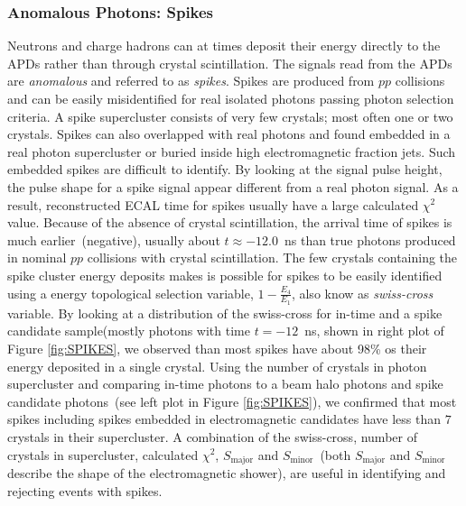 \subsubsection{Anomalous Photons: Spikes}
Neutrons and charge hadrons can at times deposit their energy directly to the APDs rather than through crystal scintillation. The signals read from the APDs are \textit{anomalous}  and referred to as \textit{spikes}. Spikes are produced from $pp$ collisions and can be easily misidentified for real isolated photons passing photon selection criteria. A spike supercluster consists of very few crystals; most often one or two crystals. Spikes can also overlapped with real photons and found embedded in a real photon supercluster or buried inside high electromagnetic fraction jets. Such embedded spikes are difficult to identify. By looking at the signal pulse height, the pulse shape for a spike signal appear different from a real photon signal. As a result, reconstructed ECAL time for spikes usually have a large calculated $\chi^{2}$ value.
\newline
Because of the absence of crystal scintillation, the arrival time of spikes is much earlier~(negative), usually about $t \approx -12.0$~ns than true photons produced in nominal $pp$ collisions with crystal scintillation. The few crystals containing the spike cluster energy deposits makes is possible for spikes to be easily identified using a energy topological selection variable, $1-\frac{E_{4}}{E_{1}}$, also know as \textit{swiss-cross} variable.  By looking at a distribution of  the swiss-cross for in-time and a spike candidate sample(mostly photons with time $t = -12$~ns, shown in right plot of Figure 
\ref{fig:SPIKES}, we observed than most spikes have about 98\% os their energy deposited in a single crystal.
Using the number of crystals in photon supercluster and comparing in-time photons to a beam halo photons and spike candidate photons~(see left plot in Figure \ref{fig:SPIKES}), we confirmed that most spikes including spikes embedded in electromagnetic candidates have less than $7$ crystals in their supercluster. A combination of the swiss-cross, number of crystals in supercluster, calculated $\chi^{2}$, $S_{\mbox{major}}$ and $ S_{\mbox{minor}}$~(both $S_{\mbox{major}}$ and $ S_{\mbox{minor}}$ describe the shape of the electromagnetic shower), are useful in identifying and rejecting events with spikes.

